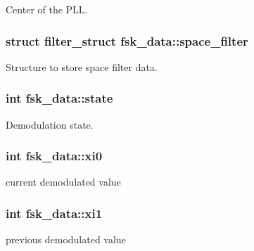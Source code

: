 Center of the P\+L\+L. 

\hypertarget{structfsk__data_afd5f314e1cf00a63eaacfa7abd3b9205}{}
\subsubsection[{space\+\_\+filter}]{\setlength{\rightskip}{0pt plus 5cm}struct {\bf filter\+\_\+struct} fsk\+\_\+data\+::space\+\_\+filter}\label{structfsk__data_afd5f314e1cf00a63eaacfa7abd3b9205}


Structure to store space filter data. 

\hypertarget{structfsk__data_a9c20aa777c4cc352227a1251cb226e14}{}
\subsubsection[{state}]{\setlength{\rightskip}{0pt plus 5cm}int fsk\+\_\+data\+::state}\label{structfsk__data_a9c20aa777c4cc352227a1251cb226e14}


Demodulation state. 

\hypertarget{structfsk__data_a72049894f5994b79f90f8b9f41969cd2}{}
\subsubsection[{xi0}]{\setlength{\rightskip}{0pt plus 5cm}int fsk\+\_\+data\+::xi0}\label{structfsk__data_a72049894f5994b79f90f8b9f41969cd2}


current demodulated value 

\hypertarget{structfsk__data_a3d199152a35ba387fa7b6ead6150c699}{}
\subsubsection[{xi1}]{\setlength{\rightskip}{0pt plus 5cm}int fsk\+\_\+data\+::xi1}\label{structfsk__data_a3d199152a35ba387fa7b6ead6150c699}


previous demodulated value 

\hypertarget{structfsk__data_a48bb683bd9e72b874c4050ae245fbc89}{}
